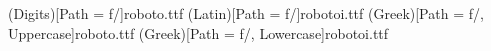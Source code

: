 \usepackage{mathspec}

\setsansfont[
	Path = f/,
	Extension = .otf,
	BoldFont=fb,
	BoldItalicFont=fbi
		]{f}
		
\setmathfont(Digits)[Path = f/]{roboto.ttf}
\setmathfont(Latin)[Path = f/]{robotoi.ttf}
\setmathfont(Greek)[Path = f/, Uppercase]{roboto.ttf}
\setmathfont(Greek)[Path = f/, Lowercase]{robotoi.ttf}
